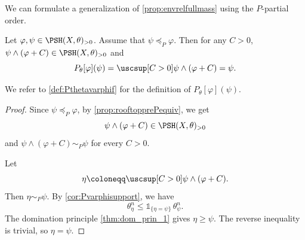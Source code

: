 We can formulate a generalization of \cref{prop:envrelfullmass} using the $P$-partial order.
\begin{corollary}\label{cor:P_par_envelope_rel}
    Let $\varphi,\psi\in \PSH(X,\theta)_{>0}$. Assume that $\psi\preceq_P \varphi$. Then for any $C>0$, $\psi\land (\varphi+C)\in \PSH(X,\theta)_{>0}$ and
    \begin{equation}\label{eq:supvarphipsipC}
        P_{\theta}[\varphi](\psi)=\uscsup[C>0] \psi\land (\varphi+C)=\psi.
    \end{equation}
\end{corollary}
We refer to \cref{def:Pthetavarphif} for the definition of $P_{\theta}[\varphi](\psi)$.
\begin{proof}
    Since $\psi\preceq_P\varphi$, by \cref{prop:rooftopprePequiv}, we get
    \[
        \psi\land(\varphi+C)\in \PSH(X,\theta)_{>0}
    \]
    and $\psi\land(\varphi+C)\sim_P\psi$ for every $C>0$.

    Let
    \[
        \eta\coloneqq \uscsup[C>0]\psi\land(\varphi+C).
    \]
    Then $\eta\sim_P \psi$.
    By \cref{cor:Pvarphisupport}, we have
    \[
        \theta_\eta^n\leq \mathds{1}_{\{\eta=\psi\}}\,\theta_\psi^n.
    \]
    The domination principle \cref{thm:dom_prin_1} gives $\eta\geq \psi$. The reverse inequality is trivial, so $\eta=\psi$.
\end{proof}


